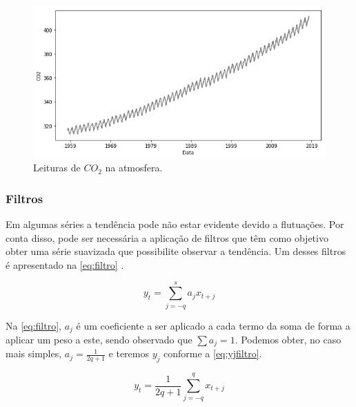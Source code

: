 \documentclass[
    12pt,
    oneside,
    a4paper,
    english,
    brazil
]{abntex2}
\begin{document}

\begin{figure}
    \centering
    \caption{Leituras de $CO_2$ na atmosfera.}\label{fig:co2}
    \includegraphics[width=.6\linewidth]{images/co2.png}
\end{figure}

\subsubsection{Filtros}

Em algumas séries a tendência pode não estar evidente devido a flutuações.
Por conta disso, pode ser necessária a aplicação de filtros que têm como objetivo obter uma série suavizada que possibilite observar a tendência. 
Um desses filtros é apresentado na \autoref{eq:filtro} \cite{ehlers}.

\begin{equation}
    \label{eq:filtro}
    y_t = \sum_{j = -q}^{s}{a_{j}x_{t+j}}
\end{equation}

Na \autoref{eq:filtro}, $a_j$ é um coeficiente a ser aplicado a cada termo da soma de forma a aplicar um peso a este, sendo observado que $\sum{a_j} = 1$.
Podemos obter, no caso mais simples, $a_j = \frac{1}{2q + 1}$ e teremos $y_j$ conforme a \autoref{eq:yjfiltro}.

\begin{equation}
    \label{eq:yjfiltro}
    y_t = \frac{1}{2q + 1}\sum_{j=-q}^{q}{x_{t+j}}
\end{equation}
\end{document}
